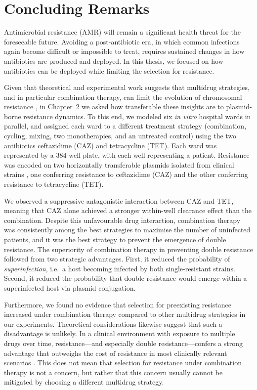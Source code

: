 \documentclass[../main.tex]{subfiles}
\begin{document}
\chapter{Concluding Remarks}
Antimicrobial resistance (AMR) will remain a significant health threat for the foreseeable future.
Avoiding a post-antibiotic era, in which common infections again become difficult or impossible to treat, requires sustained changes in how antibiotics are produced and deployed.
In this thesis, we focused on how antibiotics can be deployed while limiting the selection for resistance.

Given that theoretical and experimental work suggests that multidrug strategies, and in particular combination therapy, can limit the evolution of chromosomal resistance \cite{Bonhoeffer1997, Tepekule2017, Angst2021}, in Chapter~2 we asked how transferable these insights are to plasmid-borne resistance dynamics.
To this end, we modeled six \textit{in vitro} hospital wards in parallel, and assigned each ward to a different treatment strategy (combination, cycling, mixing, two monotherapies, and an untreated control) using the two antibiotics ceftazidime (CAZ) and tetracycline (TET).
Each ward was represented by a 384-well plate, with each well representing a patient.
Resistance was encoded on two horizontally transferable plasmids isolated from clinical strains \cite{Sutter2016}, one conferring resistance to ceftazidime (CAZ) and the other conferring resistance to tetracycline (TET).

We observed a suppressive antagonistic interaction between CAZ and TET, meaning that CAZ alone achieved a stronger within-well clearance effect than the combination.
Despite this unfavourable drug interaction, combination therapy was consistently among the best strategies to maximise the number of uninfected patients, and it was the best strategy to prevent the emergence of double resistance.
The superiority of combination therapy in preventing double resistance followed from two strategic advantages.
First, it reduced the probability of \emph{superinfection}, i.e.\ a host becoming infected by both single-resistant strains.
Second, it reduced the probability that double resistance would emerge within a superinfected host via plasmid conjugation.

Furthermore, we found no evidence that selection for preexisting resistance increased under combination therapy compared to other multidrug strategies in our experiments.
Theoretical considerations likewise suggest that such a disadvantage is unlikely.
In a clinical environment with exposure to multiple drugs over time, resistance---and especially double resistance---confers a strong advantage that outweighs the cost of resistance in most clinically relevant scenarios \cite{Tepekule2017}.
This does not mean that selection for resistance under combination therapy is not a concern, but rather that this concern usually cannot be mitigated by choosing a different multidrug strategy.
\end{document}
